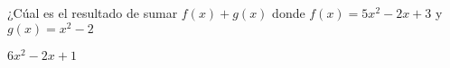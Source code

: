 
\question ¿Cúal es el resultado de sumar $f(x) + g(x)$ donde
          $f(x) = 5x^2 - 2x + 3$ y $g(x) = x^2 -2$

  \begin{solution}[1cm]
    $6x^2 - 2x + 1$
  \end{solution}
